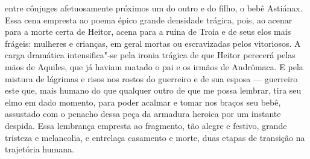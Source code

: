 {entre cônjuges afetuosamente próximos um do outro e do filho, o bebê Astiánax.
Essa cena empresta ao poema épico grande densidade trágica, pois, ao acenar
para a morte certa de Heitor, acena para a ruína de Troia e de seus elos mais
frágeis: mulheres e crianças, em geral mortas ou escravizadas pelos vitoriosos.
A carga dramática intensifica"-se pela ironia trágica de que Heitor perecerá
pelas mãos de Aquiles, que já haviam matado o pai e os irmãos de Andrômaca. E
pela mistura de lágrimas e risos nos rostos do guerreiro e de sua esposa ---
guerreiro este que, mais humano do que qualquer outro de que me possa lembrar,
tira seu elmo em dado momento, para poder acalmar e tomar nos braços seu bebê,
assustado com o penacho dessa peça da armadura heroica por um instante despida.
Essa lembrança empresta ao fragmento, tão alegre e festivo, grande tristeza e
melancolia, e entrelaça casamento e morte, duas etapas de transição na trajetória
humana.}

